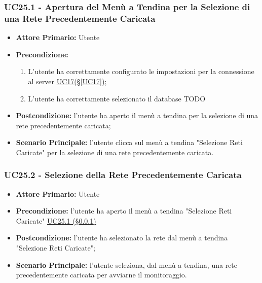 \subsubsection{UC25.1 - Apertura del Menù a Tendina per la Selezione di una Rete Precedentemente Caricata}\label{UC25.1}
\begin{itemize}
	\item \textbf{Attore Primario:}  Utente
	\item \textbf{Precondizione:} 
	\begin{enumerate}
		\item L'utente ha correttamente configurato le impostazioni per la connessione al server \hyperref[UC17]{UC17(§\ref*{UC17})};
		\item L'utente ha correttamente selezionato il database TODO %
	\end{enumerate}	
	\item \textbf{Postcondizione:} l'utente ha aperto il menù a tendina per la selezione di una rete precedentemente caricata;
	\item \textbf{Scenario Principale:} l'utente clicca sul menù a tendina "Selezione Reti Caricate" per la selezione di una rete  precedentemente caricata.
\end{itemize}

\subsubsection{UC25.2 - Selezione della Rete Precedentemente Caricata}\label{UC25.2}
\begin{itemize}
	\item \textbf{Attore Primario:} Utente
	\item \textbf{Precondizione:}  l'utente ha aperto il menù a tendina "Selezione Reti Caricate" \hyperref[UC25.1]{UC25.1 (§\ref*{UC25.1})}
	\item \textbf{Postcondizione:} l'utente ha selezionato la rete dal menù a tendina "Selezione Reti Caricate";
	\item \textbf{Scenario Principale:} l'utente seleziona, dal menù a tendina, una rete precedentemente caricata per avviarne il monitoraggio. 
\end{itemize}

\pagebreak

